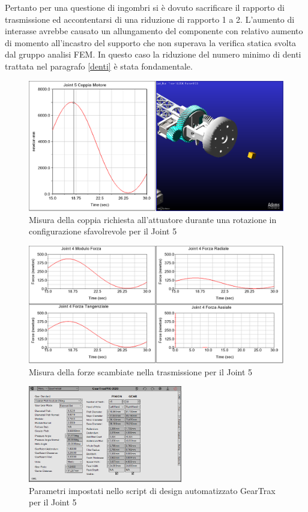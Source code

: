 \documentclass[%
corpo=11pt,
twoside,
 stile=classica,
oldstyle,
greek,%
]{toptesi}
\begin{document}
		Pertanto per una questione di ingombri si è dovuto sacrificare il rapporto di trasmissione ed accontentarsi di una riduzione di rapporto 1 a 2. L'aumento di interasse avrebbe causato un allungamento del componente con relativo aumento di momento all'incastro del supporto che non superava la verifica statica svolta dal gruppo analisi FEM. 
		In questo caso la riduzione del numero minimo di denti trattata nel paragrafo \ref{denti} è stata fondamentale. 
		
		
	

		\begin{figure} [H]
			\centering
			\includegraphics[width=1\textwidth]{Plots/POLSO2/polso2torque.png}
			\caption{Misura della coppia richiesta all'attuatore durante una rotazione in configurazione sfavolrevole per il Joint 5}
			\label{fig:MBDpolso2t}
		\end{figure} 
		\begin{figure} [H]
			\centering
			\includegraphics[width=1\textwidth]{Plots/POLSO2/polso2forces.png}
			\caption{Misura della forze scambiate nella trasmissione per il Joint 5}
			\label{fig:MBDpolso2f}
		\end{figure} 
		\begin{figure} [H]
			\centering
			\includegraphics[width=0.6\textwidth]{Plots/POLSO2/gear_polso2.png}
			\caption{Parametri impostati nello script di design automatizzato GearTrax per il Joint 5}
			\label{fig:Gearpolso2}
		\end{figure} 
\end{document}
